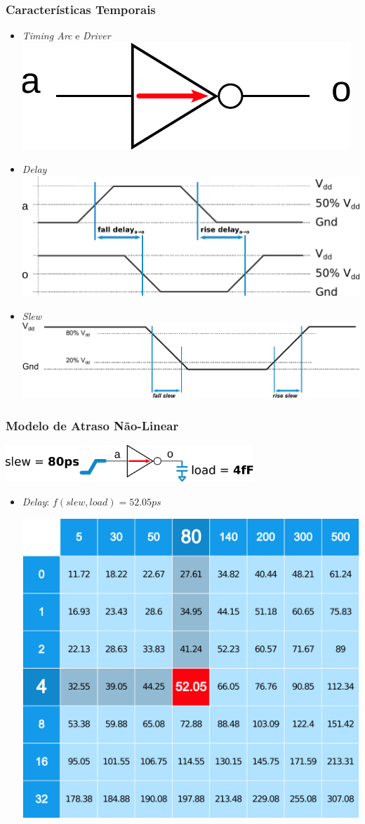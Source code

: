 \documentclass[10pt,a4paper]{beamer}
\begin{document}
			\begin{frame}
				\frametitle{Características Temporais}
				\begin{itemize}
					\item \textit{Timing Arc} e \textit{Driver} \\
						\includegraphics[width=0.3 \textwidth]{img/carac_portas_1.pdf}
					\item \textit{Delay} \\ 
						\includegraphics[width=0.7 \textwidth]{img/carac_portas_2.pdf} \pause
					\item \textit{Slew} \\
						\includegraphics[width=0.7 \textwidth]{img/carac_portas_3.pdf}
				\end{itemize}

				
			\end{frame}

			
			\begin{frame}
				\frametitle{Modelo de Atraso Não-Linear}
					\begin{center}
						\includegraphics[width=0.7\textwidth]{img/nldm_1.pdf}
					\end{center}
					\begin{itemize}
						\item \textit{Delay}: $f(slew, load) = 52.05ps $	\\
						\begin{center}
							\includegraphics[width=0.4 \linewidth]{img/nldm_2.pdf} 
						\end{center}
					\end{itemize}					
						
			\end{frame}
		
\end{document}
